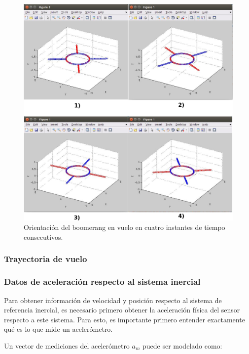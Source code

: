 		\begin{figure}[h]
		\begin{center}
		\includegraphics[scale=0.25]{imagenes/3-boomerang/orientacion_boomerang.png}
		\caption{Orientación del boomerang en vuelo en cuatro instantes de tiempo consecutivos.}
		\label{fig21}
		\end{center}
		\end{figure}

	\subsubsection{Trayectoria de vuelo}

	\subsubsection{Datos de aceleración respecto al sistema inercial}

	Para obtener información de velocidad y posición respecto al sistema de referencia inercial, es necesario primero obtener la aceleración física del sensor respecto a este sistema. Para esto, es importante primero entender exactamente qué es lo que mide un acelerómetro.

	Un vector de mediciones del acelerómetro ${a}_{m}$ puede ser modelado como:

